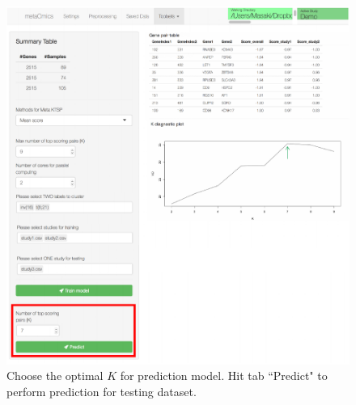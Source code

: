 \documentclass{article}
\begin{document}
\begin{figure}[H]
\begin{center}
\includegraphics[scale=0.7]{./figure/MetaKTSP/Figure11.pdf}
\caption{Choose the optimal $K$ for prediction model. Hit tab ``Predict" to perform prediction for testing dataset.}
\label{fig:Predict}
\end{center}
\end{figure}
\end{document}
